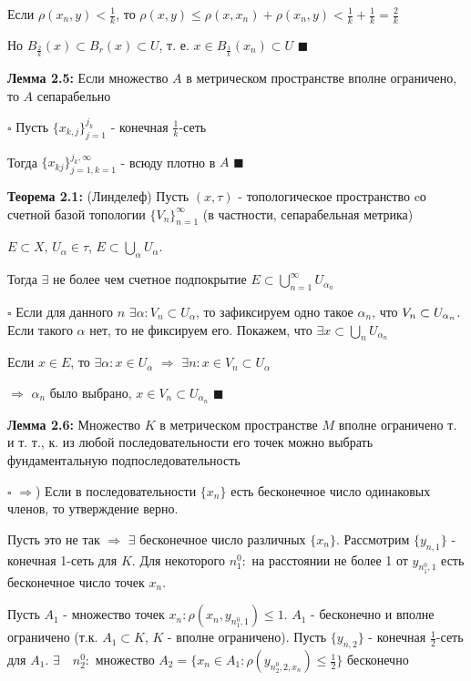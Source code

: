 \documentclass[a4paper]{report}
\newcommand*{\hm}[1]{#1\nobreak\discretionary{}%
            {\hbox{$\mathsurround=0pt #1$}}{}}
\begin{document}
Если $\rho(x_n,y)<\frac1k$, то $\rho(x,y)\le\rho(x,x_n)+\rho(x_n,y)<
\frac1k+\frac1k=\frac2k$

Но $B_{\frac2k}(x)\subset B_r(x)\subset U$, т. е. $x\in B_{\frac1k}(x_n)\subset U$ $\blacksquare$
\bigskip

\noindent\textbf{Лемма 2.5:} Если множество $A$ в метрическом пространстве вполне ограничено, то $A$ сепарабельно

\noindent $\square$ Пусть $\{x_{k,j}\}_{j=1}^{j_k}$ - конечная $\frac1k$-сеть

Тогда $\{x_{kj}\}_{j=1,k=1}^{j_k,\infty}$ - всюду плотно в $A$ $\blacksquare$
\bigskip

\noindent\textbf{Теорема 2.1:} (Линделеф) Пусть $(x,\tau)$ - топологическое пространство cо счетной базой топологии
$\{V_n\}_{n=1}^\infty$ (в частности, сепарабельная метрика)

$E\subset X$, $U_\alpha\in\tau$, $E\subset\bigcup\limits_\alpha
U_\alpha$.

Тогда $\exists$ не более чем счетное подпокрытие $E\subset\bigcup\limits_{n=1}^\infty U_{\alpha_n}$

\noindent $\square$ Если для данного $n$ $\exists\alpha\colon V_n\subset U_\alpha$, то зафиксируем одно такое $\alpha_n$,
что $V_n\hm\subset U_{\alpha_n}$. Если такого $\alpha$ нет, то не фиксируем его. Покажем, что $\exists x\subset
\bigcup\limits_n U_{\alpha_n}$

 Если $x\in E$, то $\exists\alpha\colon x\in U_\alpha$ $\Rightarrow$ $\exists n\colon x\in
V_n\subset U_\alpha$

$\Rightarrow$ $\alpha_n$ было выбрано, $x\in V_n\subset U_{\alpha_n}$ $\blacksquare$
\bigskip

\noindent\textbf{Лемма 2.6:} Множество $K$ в метрическом пространстве $M$ вполне ограничено т. и т. т., к. из любой
последовательности его точек можно выбрать фундаментальную подпоследовательность

\noindent $\square$ $\Rightarrow$) Если в последовательности $\{x_n\}$ есть бесконечное число одинаковых членов, то
утверждение верно.

Пусть это не так $\Rightarrow$ $\exists$ бесконечное число различных $\{x_n\}$. Рассмотрим $\{y_{n,1}\}$ - конечная
1-сеть для $K$. Для некоторого $n_1^0\colon$ на расстоянии не более 1 от $y_{n_1^0,1}$ есть бесконечное число точек $x_n$.

Пусть $A_1$ - множество точек $x_n\colon\rho(x_n,y_{n_1^0,1})\le1$. $A_1$ - бесконечно и вполне ограничено (т.к. $A_1
\subset K$, $K$ - вполне ограничено). Пусть $\{y_{n,2}\}$ - конечная $\frac12$-сеть для $A_1$. $\exists\quad n_2^0\colon$
множество $A_2=\{x_n\in A_1\colon\rho(y_{n_2^0,2,x_n})\le\frac12\}$ бесконечно
\end{document}
